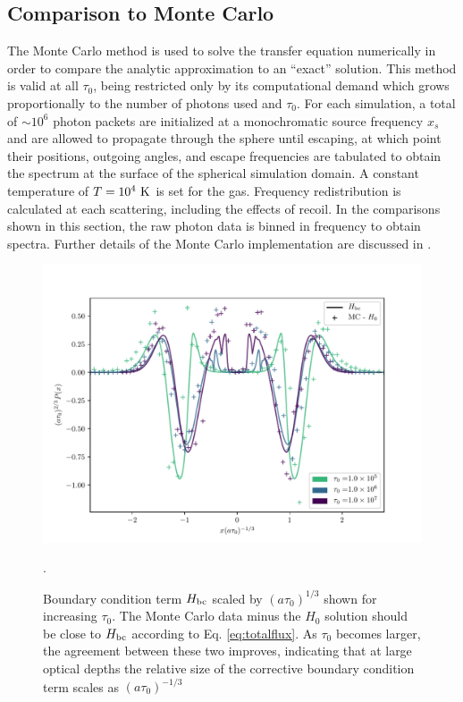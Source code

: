 \documentclass{aastex63}
\begin{document}
\subsection{Comparison to Monte Carlo}
The Monte Carlo method is used to solve the transfer equation numerically in order to compare the analytic approximation to an ``exact'' solution. This method is valid at all $\tau_0$, being restricted only by its computational demand which grows proportionally to the number of photons used and $\tau_0$. For each simulation, a total of ${\sim}10^6$ photon packets are initialized at a monochromatic source frequency $x_s$ and are allowed to propagate through the sphere until escaping, at which point their positions, outgoing angles, and escape frequencies are tabulated to obtain the spectrum at the surface of the spherical simulation domain. A constant temperature of $T=10^4\ \rm K$ is set for the gas. Frequency redistribution is calculated at each scattering, including the effects of recoil. In the comparisons shown in this section, the raw photon data is binned in frequency to obtain spectra. Further details of the Monte Carlo implementation are discussed in \cite{2017ApJ...851..150H}.

\ifx
\begin{figure}
    \centering
    \includegraphics{taubc.pdf}
    \caption{Boundary condition term $H_{\rm bc}$ scaled by $(a\tau_0)^{1/3}$ shown for increasing $\tau_0$. The Monte Carlo data minus the $H_0$ solution should be close to $H_{\rm bc}$ according to Eq. \ref{eq:totalflux}. As $\tau_0$ becomes larger, the agreement between these two improves, indicating that at large optical depths the relative size of the corrective boundary condition term scales as $(a\tau_0)^{-1/3}$}.
    \label{fig:taubc}
\end{figure}
\fi
\end{document}

